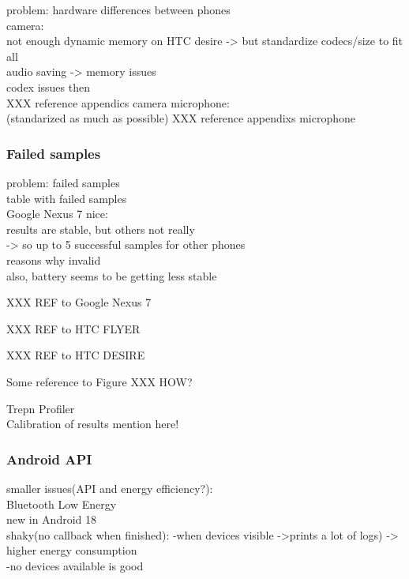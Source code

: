 problem: hardware differences between phones\\
	camera:\\
		not enough dynamic memory on HTC desire -> but standardize codecs/size to fit all\\
		audio saving -> memory issues\\
			codex issues then\\
			XXX reference appendics camera
	microphone:\\
		(standarized as much as possible)
		XXX reference appendixs microphone
			
\subsubsection{Failed samples}
problem: failed samples\\
	table with failed samples\\
	Google Nexus 7 nice:\\
		results are stable, but others not really\\
			-> so up to 5 successful samples for other phones\\
	reasons why invalid\\
	
	also, battery seems to be getting less stable
	
	XXX REF to Google Nexus 7
	

	XXX REF to HTC FLYER

	XXX REF to HTC DESIRE



Some reference to Figure XXX HOW?





	Trepn Profiler\\
	
	
	
	Calibration of results mention here!\\

\subsubsection{Android API}
smaller issues(API and energy efficiency?):\\
	Bluetooth Low Energy\\
		new in Android 18\\
		shaky(no callback when finished):
			-when devices visible ->prints a lot of logs) -> higher energy consumption\\
			-no devices available is good
		
